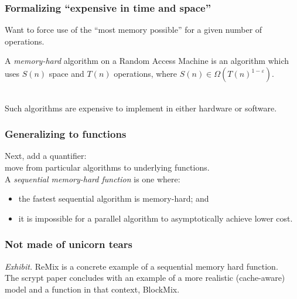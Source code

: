 \begin{frame}
  \frametitle{Formalizing ``expensive in time and space''}
  
    Want to force use of the ``most memory possible'' for a given
    number of operations.\\[1em]
  
    \begin{defn}
      A \emph{memory-hard} algorithm on a Random Access Machine is an
      algorithm which uses $S(n)$ space and $T(n)$ operations, where
      $S(n) \in \Omega(T(n)^{1-\varepsilon})$.
    \end{defn}~\\
    
      Such algorithms are expensive to implement in either hardware or software.
    

\end{frame}

\begin{frame}
  \frametitle{Generalizing to functions}
  
    Next, add a quantifier: \\move from particular algorithms to underlying functions.\\[1em]
    A \emph{sequential memory-hard function} is one where:

    \begin{itemize}
      \item the fastest
        sequential algorithm is memory-hard; and
      \item it is impossible for a
        parallel algorithm to asymptotically achieve lower cost.
    \end{itemize}
  
\end{frame}

\begin{frame}
  \frametitle{Not made of unicorn tears}
  
    \emph{Exhibit.} ReMix is a concrete example of a sequential memory hard function.\\[1em]
    The scrypt paper concludes with an example of a more realistic (cache-aware) model and
    a function in that context, BlockMix.
  
\end{frame}


